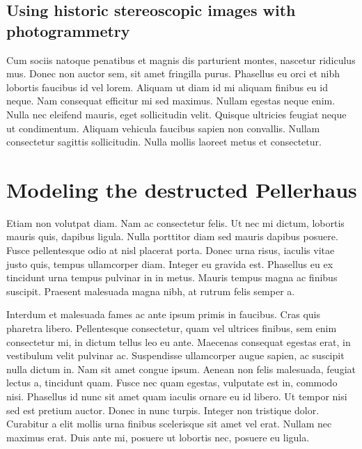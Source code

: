 \subsection{Using historic stereoscopic images with photogrammetry}

Cum sociis natoque penatibus et magnis dis parturient montes, nascetur ridiculus mus. Donec non auctor sem, sit amet fringilla purus. Phasellus eu orci et nibh lobortis faucibus id vel lorem. Aliquam ut diam id mi aliquam finibus eu id neque. Nam consequat efficitur mi sed maximus. Nullam egestas neque enim. Nulla nec eleifend mauris, eget sollicitudin velit. Quisque ultricies feugiat neque ut condimentum. Aliquam vehicula faucibus sapien non convallis. Nullam consectetur sagittis sollicitudin. Nulla mollis laoreet metus et consectetur.







\section{Modeling the destructed Pellerhaus}

Etiam non volutpat diam. Nam ac consectetur felis. Ut nec mi dictum, lobortis mauris quis, dapibus ligula. Nulla porttitor diam sed mauris dapibus posuere. Fusce pellentesque odio at nisl placerat porta. Donec urna risus, iaculis vitae justo quis, tempus ullamcorper diam. Integer eu gravida est. Phasellus eu ex tincidunt urna tempus pulvinar in in metus. Mauris tempus magna ac finibus suscipit. Praesent malesuada magna nibh, at rutrum felis semper a\parencite[compare][]{webLaTeX-Tutorial}.

Interdum et malesuada fames ac ante ipsum primis in faucibus. Cras quis pharetra libero. Pellentesque consectetur, quam vel ultrices finibus, sem enim consectetur mi, in dictum tellus leo eu ante. Maecenas consequat egestas erat, in vestibulum velit pulvinar ac. Suspendisse ullamcorper augue sapien, ac suscipit nulla dictum in. Nam sit amet congue ipsum. Aenean non felis malesuada, feugiat lectus a, tincidunt quam. Fusce nec quam egestas, vulputate est in, commodo nisi. Phasellus id nunc sit amet quam iaculis ornare eu id libero. Ut tempor nisi sed est pretium auctor. Donec in nunc turpis. Integer non tristique dolor. Curabitur a elit mollis urna finibus scelerisque sit amet vel erat. Nullam nec maximus erat. Duis ante mi, posuere ut lobortis nec, posuere eu ligula\parencite[e.g.][page300]{dp_lidar}.

